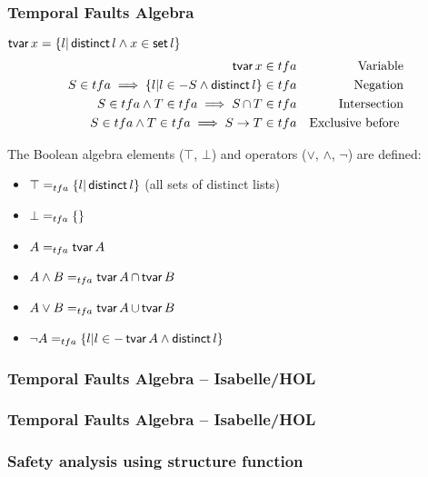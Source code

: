 \begin{frame}
\frametitle{Temporal Faults Algebra}

$\operatorname{\mathsf{tvar}} x = \{l | \operatorname{\mathsf{distinct}} l \land x \in \operatorname{\mathsf{set}} l\}$
%
\begin{subequations}
\begin{align}
%
\tvar x &\in \tfa & \text{Variable}\\
%
S \in \tfa \implies \{ l | l \in -S \land \distinct l\} &\in \tfa & \text{Negation}\\
%
S \in \tfa \land T \in \tfa \implies 
S \inter T &\in \tfa & \text{Intersection} \\
%
S \in \tfa \land T \in \tfa \implies 
S \rightarrow T & \in \tfa & \text{Exclusive before }
%
\end{align} %
%
\end{subequations}%

The Boolean algebra elements ($\top$, $\bot$) and operators ($\lor$, $\land$, $\lnot$) are defined:
\begin{itemize}
  \item $\top =_{tfa} \{l | \operatorname{\mathsf{distinct}} l\}$ (all sets of distinct lists)
  \item $\bot =_{tfa} \{\}$
  \item $A =_{tfa} \operatorname{\mathsf{tvar}} A $
  \item $A \land B =_{tfa} \operatorname{\mathsf{tvar}} A \operatorname{\cap} \operatorname{\mathsf{tvar}} B$
  \item $A \lor B =_{tfa} \operatorname{\mathsf{tvar}} A \operatorname{\cup} \operatorname{\mathsf{tvar}} B$
  \item $\lnot A =_{tfa} \{l | l \in - \operatorname{\mathsf{tvar}} A \land \operatorname{\mathsf{distinct}} l\}$
\end{itemize}
\end{frame}

\begin{frame}
\frametitle{Temporal Faults Algebra -- Isabelle/HOL}

\end{frame}

\begin{frame}
\frametitle{Temporal Faults Algebra -- Isabelle/HOL}
\end{frame}

\begin{frame}
\frametitle{Safety analysis using structure function}


\end{frame}